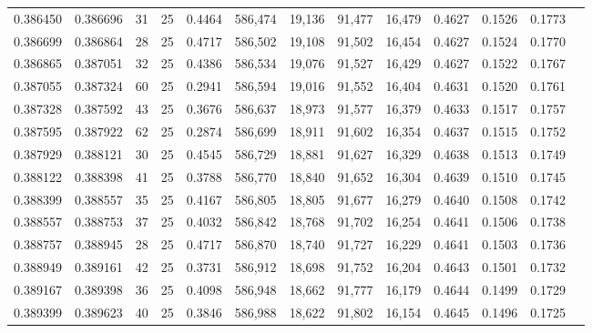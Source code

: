 \begin{tabular}{rrrrrrrrrrrrr}
0.386450 & 0.386696 &    31 &  25 &                                     0.4464 & 586,474 &  19,136 &  91,477 &  16,479 & 0.4627 & 0.1526 & 0.1773 \\
0.386699 & 0.386864 &    28 &  25 &                                     0.4717 & 586,502 &  19,108 &  91,502 &  16,454 & 0.4627 & 0.1524 & 0.1770 \\
0.386865 & 0.387051 &    32 &  25 &                                     0.4386 & 586,534 &  19,076 &  91,527 &  16,429 & 0.4627 & 0.1522 & 0.1767 \\
0.387055 & 0.387324 &    60 &  25 &                                     0.2941 & 586,594 &  19,016 &  91,552 &  16,404 & 0.4631 & 0.1520 & 0.1761 \\
0.387328 & 0.387592 &    43 &  25 &                                     0.3676 & 586,637 &  18,973 &  91,577 &  16,379 & 0.4633 & 0.1517 & 0.1757 \\
0.387595 & 0.387922 &    62 &  25 &                                     0.2874 & 586,699 &  18,911 &  91,602 &  16,354 & 0.4637 & 0.1515 & 0.1752 \\
0.387929 & 0.388121 &    30 &  25 &                                     0.4545 & 586,729 &  18,881 &  91,627 &  16,329 & 0.4638 & 0.1513 & 0.1749 \\
0.388122 & 0.388398 &    41 &  25 &                                     0.3788 & 586,770 &  18,840 &  91,652 &  16,304 & 0.4639 & 0.1510 & 0.1745 \\
0.388399 & 0.388557 &    35 &  25 &                                     0.4167 & 586,805 &  18,805 &  91,677 &  16,279 & 0.4640 & 0.1508 & 0.1742 \\
0.388557 & 0.388753 &    37 &  25 &                                     0.4032 & 586,842 &  18,768 &  91,702 &  16,254 & 0.4641 & 0.1506 & 0.1738 \\
0.388757 & 0.388945 &    28 &  25 &                                     0.4717 & 586,870 &  18,740 &  91,727 &  16,229 & 0.4641 & 0.1503 & 0.1736 \\
0.388949 & 0.389161 &    42 &  25 &                                     0.3731 & 586,912 &  18,698 &  91,752 &  16,204 & 0.4643 & 0.1501 & 0.1732 \\
0.389167 & 0.389398 &    36 &  25 &                                     0.4098 & 586,948 &  18,662 &  91,777 &  16,179 & 0.4644 & 0.1499 & 0.1729 \\
0.389399 & 0.389623 &    40 &  25 &                                     0.3846 & 586,988 &  18,622 &  91,802 &  16,154 & 0.4645 & 0.1496 & 0.1725 \\

\end{tabular}

